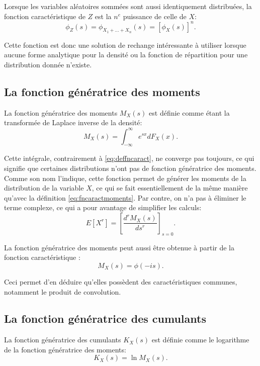 Lorsque les variables aléatoires sommées sont aussi identiquement
distribuées, la fonction caractéristique de $Z$ est la $n^e$ puissance
de celle de $X$:
\begin{equation}
  \label{eq:convocaractIID}
  \phi_{Z}(s) = \phi_{X_1+\ldots+X_n}(s) = \left[\phi_{X}(s)\right]^n.
\end{equation}

Cette fonction est donc une solution de rechange intéressante à
utiliser lorsque aucune forme analytique pour la densité ou la
fonction de répartition pour une distribution donnée n'existe.

\subsection{La fonction génératrice des moments}
\label{sec:fgm}
La fonction génératrice des moments $M_X(s)$
 est définie comme étant la
transformée de Laplace inverse 
de la densité:
\begin{equation}
  \label{eq:deffngenmom}
  M_X(s) = \int_{-\infty}^{\infty} e^{sx} dF_X(x).
\end{equation}

Cette intégrale, contrairement à \eqref{eq:deffncaract}, ne converge
pas toujours, ce qui signifie que certaines distributions n'ont pas de
fonction génératrice des moments. Comme son nom l'indique, cette
fonction permet de générer les moments de la distribution de la
variable $X$, ce qui se fait essentiellement de la même manière
qu'avec la définition \eqref{eq:fncaractmoments}. Par contre, on n'a
pas à éliminer le terme complexe, ce qui a pour avantage de simplifier
les calculs:
\begin{equation}
  \label{eq:fgmmoments}
  E[X^r] = \left[ \frac{d^r M_X(s)}{ds^r} \right]_{s=0}.
\end{equation}

La fonction génératrice des moments peut aussi être obtenue à partir
de la fonction caractéristique :
\begin{equation}
  \label{eq:fncaractfgm}
  M_X(s) = \phi(-is).
\end{equation}

Ceci permet d'en déduire qu'elles possèdent des caractéristiques
communes, notamment le produit de convolution.

\subsection{La fonction génératrice des cumulants}
\label{sec:fgc}
La fonction génératrice des cumulants $K_X(s)$ est définie comme le
logarithme de la fonction génératrice des moments:
\begin{equation}
  \label{eq:fgc}
  K_X(s) = \ln{M_X(s)}.
\end{equation}

